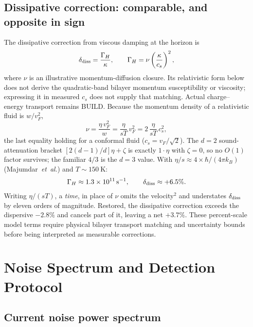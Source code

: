 \documentclass[aps,prd,twocolumn,showpacs,superscriptaddress,nofootinbib]{revtex4-2}
\begin{document}
\subsection{Dissipative correction: comparable, and opposite in sign}

The dissipative correction from viscous damping at the horizon is
\begin{equation}
\delta_{\rm diss} = \frac{\Gamma_H}{\kappa}, \qquad
\Gamma_H = \nu \left(\frac{\kappa}{c_s}\right)^2,
\end{equation}
where $\nu$ is an illustrative momentum-diffusion closure. Its
relativistic form below does not derive the quadratic-band bilayer
momentum susceptibility or viscosity; expressing it in measured $c_s$
does not supply that matching. Actual charge--energy transport remains
BUILD. Because the momentum
density of a relativistic fluid is $w/v_F^2$,
\begin{equation}
\nu = \frac{\eta\,v_F^2}{w} = \frac{\eta}{s T}\,v_F^2
    = 2\,\frac{\eta}{s T}\,c_s^2 ,
\end{equation}
the last equality holding for a conformal fluid ($c_s = v_F/\sqrt{2}$).
The $d = 2$ sound-attenuation bracket $[2(d-1)/d]\eta + \zeta$ is exactly
$1\cdot\eta$ with $\zeta = 0$, so no $O(1)$ factor survives; the familiar
$4/3$ is the $d = 3$ value. With $\eta/s \approx 4 \times \hbar/(4\pi k_B)$
(Majumdar~\textit{et~al.}) and $T \sim \SI{150}{\kelvin}$:
\begin{equation}
\Gamma_H \approx \SI{1.3e11}{\per\second}, \qquad
\delta_{\rm diss} \approx +6.5\%.
\end{equation}
Writing $\eta/(sT)$, a \emph{time}, in place of $\nu$ omits the
velocity$^2$ and understates $\delta_{\rm diss}$ by eleven orders of
magnitude. Restored, the dissipative correction exceeds the dispersive
$-2.8\%$ and cancels part of it, leaving a net $+3.7\%$. These percent-scale model terms require physical bilayer transport
matching and uncertainty bounds before being interpreted as measurable corrections.

\section{Noise Spectrum and Detection Protocol}
\label{sec:detection}

\subsection{Current noise power spectrum}
\end{document}
